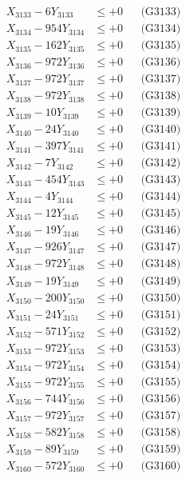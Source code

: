 \documentclass[a4paper,10pt]{article}
\begin{document}
{\begin{align}
X_{3133} - 6Y_{3133} &\leq +0 && \text{(G3133)} \\
X_{3134} - 954Y_{3134} &\leq +0 && \text{(G3134)} \\
X_{3135} - 162Y_{3135} &\leq +0 && \text{(G3135)} \\
X_{3136} - 972Y_{3136} &\leq +0 && \text{(G3136)} \\
X_{3137} - 972Y_{3137} &\leq +0 && \text{(G3137)} \\
X_{3138} - 972Y_{3138} &\leq +0 && \text{(G3138)} \\
X_{3139} - 10Y_{3139} &\leq +0 && \text{(G3139)} \\
X_{3140} - 24Y_{3140} &\leq +0 && \text{(G3140)} \\
\allowbreak
X_{3141} - 397Y_{3141} &\leq +0 && \text{(G3141)} \\
X_{3142} - 7Y_{3142} &\leq +0 && \text{(G3142)} \\
X_{3143} - 454Y_{3143} &\leq +0 && \text{(G3143)} \\
X_{3144} - 4Y_{3144} &\leq +0 && \text{(G3144)} \\
X_{3145} - 12Y_{3145} &\leq +0 && \text{(G3145)} \\
X_{3146} - 19Y_{3146} &\leq +0 && \text{(G3146)} \\
X_{3147} - 926Y_{3147} &\leq +0 && \text{(G3147)} \\
X_{3148} - 972Y_{3148} &\leq +0 && \text{(G3148)} \\
X_{3149} - 19Y_{3149} &\leq +0 && \text{(G3149)} \\
X_{3150} - 200Y_{3150} &\leq +0 && \text{(G3150)} \\
\allowbreak
X_{3151} - 24Y_{3151} &\leq +0 && \text{(G3151)} \\
X_{3152} - 571Y_{3152} &\leq +0 && \text{(G3152)} \\
X_{3153} - 972Y_{3153} &\leq +0 && \text{(G3153)} \\
X_{3154} - 972Y_{3154} &\leq +0 && \text{(G3154)} \\
X_{3155} - 972Y_{3155} &\leq +0 && \text{(G3155)} \\
X_{3156} - 744Y_{3156} &\leq +0 && \text{(G3156)} \\
X_{3157} - 972Y_{3157} &\leq +0 && \text{(G3157)} \\
X_{3158} - 582Y_{3158} &\leq +0 && \text{(G3158)} \\
X_{3159} - 89Y_{3159} &\leq +0 && \text{(G3159)} \\
X_{3160} - 572Y_{3160} &\leq +0 && \text{(G3160)} \\

\end{align}}
\end{document}
